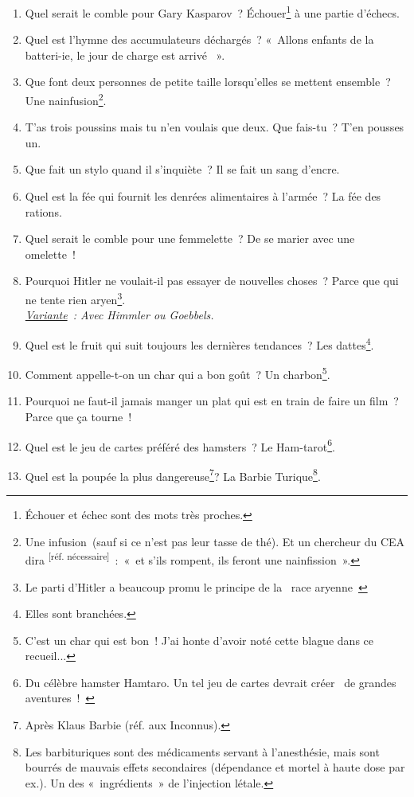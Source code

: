 \documentclass[10pt,a5paper,fullpage]{book}
\begin{document}
\begin{enumerate}
		\item Quel serait le comble pour Gary Kasparov~? Échouer\footnote{Échouer et échec sont des mots très proches.} à une partie d'échecs. 
		\item Quel est l’hymne des accumulateurs déchargés~? « Allons enfants de la batteri-ie, le jour de charge est arrivé \textmusicalnote ».
		\item Que font deux personnes de petite taille lorsqu'elles se mettent ensemble~? Une nainfusion\footnote{Une infusion (sauf si ce n'est pas leur tasse de thé). Et un chercheur du CEA dira \textsuperscript{[réf. nécessaire]}~: «~et s’ils rompent, ils feront une nainfission~».}.
		\item T’as trois poussins mais tu n'en voulais que deux. Que fais-tu~? T’en pousses un.
		\item Que fait un stylo quand il s’inquiète~? Il se fait un sang d’encre.
		\item Quel est la fée qui fournit les denrées alimentaires à l’armée~? La fée des rations.
		\item Quel serait le comble pour une femmelette~? De se marier avec une omelette~!
		\item Pourquoi Hitler ne voulait-il pas essayer de nouvelles choses~? Parce que qui ne tente rien aryen\footnote{Le parti d'Hitler a beaucoup promu le principe de la \guillemotleft~race aryenne~\guillemotright}. \\\textit{\underline{Variante}~: Avec Himmler ou Goebbels.}
		\item Quel est le fruit qui suit toujours les dernières tendances~? Les dattes\footnote{Elles sont branchées.}.
		\item Comment appelle-t-on un char qui a bon goût~? Un charbon\footnote{C'est un char qui est bon~! J'ai honte d'avoir noté cette blague dans ce recueil...}.
		\item Pourquoi ne faut-il jamais manger un plat qui est en train de faire un film~? Parce que ça tourne~!
		\item Quel est le jeu de cartes préféré des hamsters~? Le Ham-tarot\footnote{Du célèbre hamster Hamtaro. Un tel jeu de cartes devrait créer \guillemotleft~de grandes aventures~!~\guillemotright}.
		\item Quel est la poupée la plus dangereuse\footnote{Après Klaus Barbie (réf. aux Inconnus).}? La Barbie Turique\footnote{Les barbituriques sont des médicaments servant à l’anesthésie, mais sont bourrés de mauvais effets secondaires (dépendance et mortel à haute dose par ex.). Un des « ingrédients » de l’injection létale.}. 

\end{enumerate}
\end{document}
